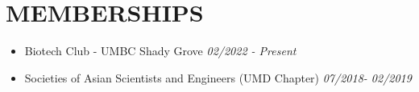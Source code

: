 \documentclass[11pt,a4paper,roman]{moderncv}
\begin{document}
\section{MEMBERSHIPS}
{\begin{itemize}
    \item {Biotech Club - UMBC Shady Grove} \hfill {\itshape 02/2022 - Present}
    \item {Societies of Asian Scientists and Engineers (UMD Chapter)} \hfill{\itshape 07/2018- 02/2019}
  \end{itemize}
}

\setlength{\columnwidth}{\textwidth}
\addtolength{\columnwidth}{-\columnsep}
\setlength{\columnwidth}{.5\columnwidth}

\setlength{\hintscolumnwidth}{0.175\columnwidth}
\setlength{\separatorcolumnwidth}{0.025\columnwidth}
%
\renewcommand*{\recomputecvbodylengths}{%
  \setlength{\maincolumnwidth}{\columnwidth-\leftskip-\rightskip-\separatorcolumnwidth-\hintscolumnwidth}%
  \setlength{\listitemcolumnwidth}{\maincolumnwidth-\listitemsymbolwidth}%
  \setlength{\doubleitemcolumnwidth}{\maincolumnwidth-\hintscolumnwidth-\separatorcolumnwidth-\separatorcolumnwidth}%
  \setlength{\doubleitemcolumnwidth}{0.5\doubleitemcolumnwidth}%
  \setlength{\listdoubleitemcolumnwidth}{\maincolumnwidth-\listitemsymbolwidth-\separatorcolumnwidth-\listitemsymbolwidth}%
  \setlength{\listdoubleitemcolumnwidth}{0.5\listdoubleitemcolumnwidth}%
  \setlength{\parskip}{0pt}}
\recomputecvbodylengths


% 
%                         
\end{document}
